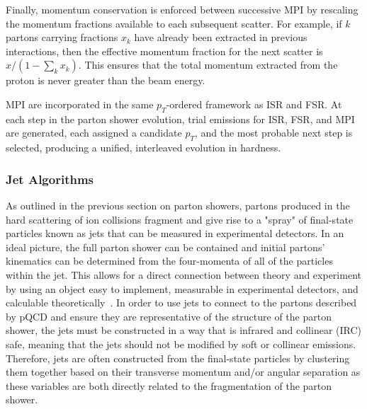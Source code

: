 Finally, momentum conservation is enforced between successive MPI by rescaling the momentum fractions available to each subsequent scatter. 
For example, if $k$ partons carrying fractions $x_k$ have already been extracted in previous interactions, then the effective momentum fraction for the next scatter is $x/(1 - \sum_k x_k)$.
This ensures that the total momentum extracted from the proton is never greater than the beam energy. 

MPI are incorporated in the same $p_T$-ordered framework as ISR and FSR. 
At each step in the parton shower evolution, trial emissions for ISR, FSR, and MPI are generated, each assigned a candidate $p_T$, and the most probable next step is selected, producing a unified, interleaved evolution in hardness.

\subsubsection{Jet Algorithms}
\label{sec:jet_algo}
As outlined in the previous section on parton showers, partons produced in the hard scattering of ion collisions fragment and give rise to a "spray" of final-state particles known as jets that can be measured in experimental detectors.
In an ideal picture, the full parton shower can be contained and initial partons' kinematics can be determined from the four-momenta of all of the particles within the jet.
This allows for a direct connection between theory and experiment by using an object easy to implement, measurable in experimental detectors, and calculable theoretically~\cite{Cacciari:2012fastjet_manual}. 
In order to use jets to connect to the partons described by pQCD and ensure they are representative of the structure of the parton shower, the jets must be constructed in a way that is infrared and collinear (IRC) safe, meaning that the jets should not be modified by soft or collinear emissions.
Therefore, jets are often constructed from the final-state particles by clustering them together based on their transverse momentum and/or angular separation as these variables are both directly related to the fragmentation of the parton shower.

